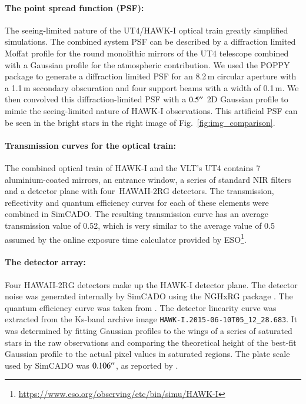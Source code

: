 \paragraph{The point spread function (PSF):}
The seeing-limited nature of the UT4/HAWK-I optical train greatly simplified simulations.
The combined system PSF can be described by a diffraction limited Moffat profile for the round monolithic mirrors of the UT4 telescope \citep{vlt_mirror} combined with a Gaussian profile for the atmospheric contribution.
We used the POPPY package \citep{poppy} to generate a diffraction limited PSF for an 8.2\,m circular aperture with a 1.1\,m secondary obscuration and four support beams with a width of 0.1\,m.
We then convolved this diffraction-limited PSF with a $0.5^{\prime\prime}$ 2D Gaussian profile to mimic the seeing-limited nature of HAWK-I observations.
This artificial PSF can be seen in the bright stars in the right image of Fig.~\ref{fig:img_comparison}.

\paragraph{Transmission curves for the optical train:}
The combined optical train of HAWK-I and the VLT's UT4 contains 7 aluminium-coated mirrors, an entrance window, a series of standard NIR filters and a detector plane with four~HAWAII-2RG detectors.
The transmission, reflectivity and quantum efficiency curves for each of these elements were combined in SimCADO.
The resulting transmission curve has an average transmission value of 0.52, which is very similar to the average value of 0.5 assumed by the online exposure time calculator provided by ESO\footnote{\url{https://www.eso.org/observing/etc/bin/simu/HAWK-I}}.

\paragraph{The detector array:}
Four HAWAII-2RG detectors \citep{hawaii2rg} make up the HAWK-I detector plane.
The detector noise was generated internally by SimCADO using the NGHxRG package \citep{nghxrg}.
The quantum efficiency curve was taken from \citet{finger2008}.
The detector linearity curve was extracted from the Ks-band archive image \verb+HAWK-I.2015-06-10T05_12_28.683+.
It was determined by fitting Gaussian profiles to the wings of a series of saturated stars in the raw observations and comparing the theoretical height of the best-fit Gaussian profile to the actual pixel values in saturated regions.
The plate scale used by SimCADO was $0.106^{\prime\prime}$, as reported by \citet{hawki}.

